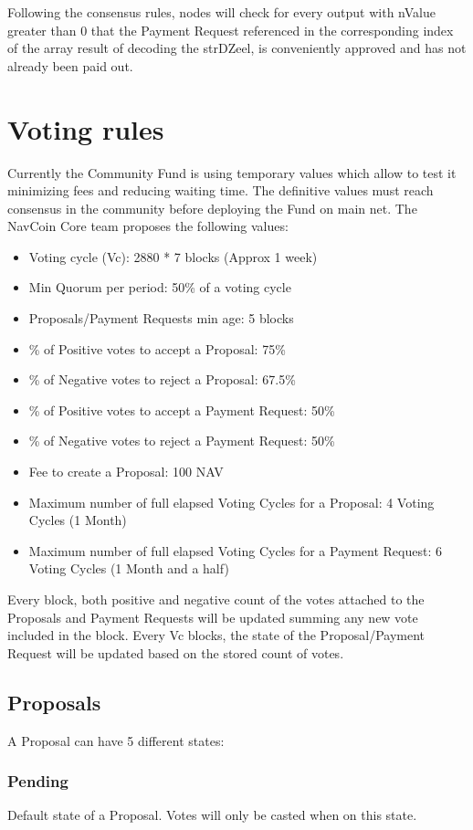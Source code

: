 \documentclass{artikel1}
\begin{document}
\begin{flushleft}
Following the consensus rules, nodes will check for every output with nValue greater than 0 that the Payment Request referenced in the corresponding index of the array result of decoding the strDZeel, is conveniently approved and has not already been paid out. 

\section{Voting rules}
Currently the Community Fund is using temporary values which allow to test it minimizing fees and reducing waiting time. The definitive values must reach consensus in the community before deploying the Fund on main net.
The NavCoin Core team proposes the following values:
\begin{itemize}
	\item Voting cycle (Vc): 2880 * 7 blocks (Approx 1 week)
	\item Min Quorum per period: 50\% of a voting cycle
	\item Proposals/Payment Requests min age: 5 blocks
	\item \% of Positive votes to accept a Proposal: 75\%
	\item \% of Negative votes to reject a Proposal: 67.5\%
	\item \% of Positive votes to accept a Payment Request: 50\%
	\item \% of Negative votes to reject a Payment Request: 50\%
	\item Fee to create a Proposal: 100 NAV
	\item Maximum number of full elapsed Voting Cycles for a Proposal: 4 Voting Cycles (1 Month)
	\item Maximum number of full elapsed Voting Cycles for a Payment Request: 6 Voting Cycles (1 Month and a half)
\end{itemize}
Every block, both positive and negative count of the votes attached to the Proposals and Payment Requests will be updated summing any new vote included in the block.
Every Vc blocks, the state of the Proposal/Payment Request will be updated based on the stored count of votes.
\subsection{Proposals}
A Proposal can have 5 different states:
\subsubsection{Pending}
Default state of a Proposal. Votes will only be casted when on this state.

\end{flushleft}
\end{document}
